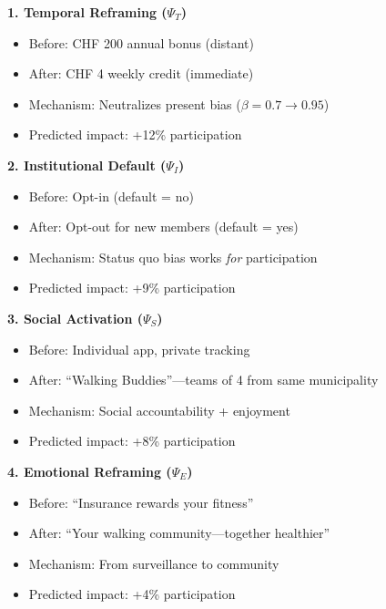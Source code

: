\begin{tcolorbox}[colback=blue!5!white, colframe=blue!75!black,
    title=\textbf{Intervention Design Based on $\Psi$-Analysis}]

\textbf{1. Temporal Reframing ($\Psi_T$)}
\begin{itemize}[nosep]
    \item Before: CHF 200 annual bonus (distant)
    \item After: CHF 4 weekly credit (immediate)
    \item Mechanism: Neutralizes present bias ($\beta = 0.7 \rightarrow 0.95$)
    \item Predicted impact: +12\% participation
\end{itemize}

\textbf{2. Institutional Default ($\Psi_I$)}
\begin{itemize}[nosep]
    \item Before: Opt-in (default = no)
    \item After: Opt-out for new members (default = yes)
    \item Mechanism: Status quo bias works \textit{for} participation
    \item Predicted impact: +9\% participation
\end{itemize}

\textbf{3. Social Activation ($\Psi_S$)}
\begin{itemize}[nosep]
    \item Before: Individual app, private tracking
    \item After: ``Walking Buddies''---teams of 4 from same municipality
    \item Mechanism: Social accountability + enjoyment
    \item Predicted impact: +8\% participation
\end{itemize}

\textbf{4. Emotional Reframing ($\Psi_E$)}
\begin{itemize}[nosep]
    \item Before: ``Insurance rewards your fitness''
    \item After: ``Your walking community---together healthier''
    \item Mechanism: From surveillance to community
    \item Predicted impact: +4\% participation
\end{itemize}

\end{tcolorbox}

